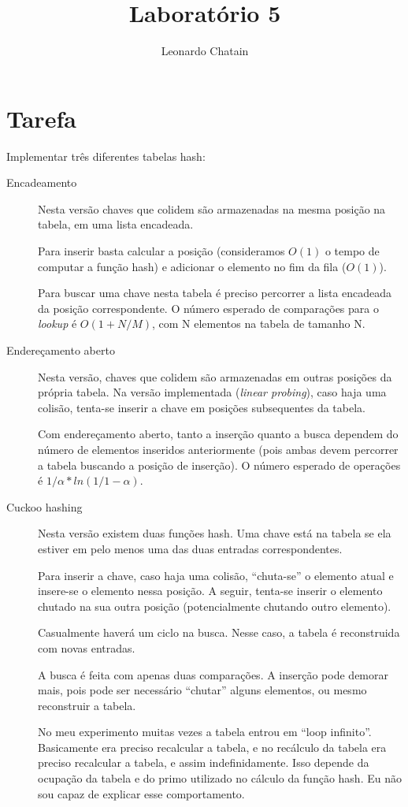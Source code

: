 \documentclass{article}
\title{Laboratório 5}
\author{Leonardo Chatain}
\begin{document}
\maketitle

\section{Tarefa}
Implementar três diferentes tabelas hash:

\begin{description}
 \item[Encadeamento] Nesta versão chaves que colidem são armazenadas na mesma posição na
tabela, em uma lista encadeada.

Para inserir basta calcular a posição (consideramos $O(1)$ o tempo de computar a função hash) e
adicionar o elemento no fim da fila ($O(1)$).

Para buscar uma chave nesta tabela é preciso percorrer a lista encadeada da posição
correspondente. O número esperado de comparações para o \emph{lookup} é $O(1 + N/M)$, com N
elementos na tabela de tamanho N.

 \item[Endereçamento aberto] Nesta versão, chaves que colidem são armazenadas em outras
posições da própria tabela. Na versão implementada (\emph{linear probing}), caso haja uma colisão,
tenta-se inserir a chave em posições subsequentes da tabela.

Com endereçamento aberto, tanto a inserção quanto a busca dependem do número de elementos inseridos
anteriormente (pois ambas devem percorrer a tabela buscando a posição de inserção). O número
esperado de operações é $1/\alpha * ln(1/1-\alpha)$.

 \item[Cuckoo hashing] Nesta versão existem duas funções hash. Uma chave está na tabela se ela
estiver em pelo menos uma das duas entradas correspondentes.

Para inserir a chave, caso haja uma colisão, ``chuta-se'' o elemento atual e insere-se o elemento
nessa posição. A seguir, tenta-se inserir o elemento chutado na sua outra posição (potencialmente
chutando outro elemento).

Casualmente haverá um ciclo na busca. Nesse caso, a tabela é reconstruida com novas entradas.

A busca é feita com apenas duas comparações. A inserção pode demorar mais, pois pode ser necessário
``chutar'' alguns elementos, ou mesmo reconstruir a tabela.

No meu experimento muitas vezes a tabela entrou em ``loop infinito''. Basicamente era preciso
recalcular a tabela, e no recálculo da tabela era preciso recalcular a tabela, e assim
indefinidamente. Isso depende da ocupação da tabela e do primo utilizado no cálculo da função hash.
Eu não sou capaz de explicar esse comportamento.

\end{description}
\end{document}

